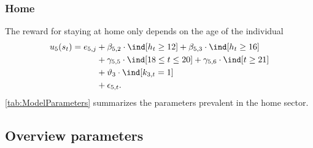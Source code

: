 \FloatBarrier\subsubsection{Home}
The reward for staying at home only depends on the age of the individual
%
\begin{align}
    u_5(s_t) =  e_{5,j} & + \beta_{5,2} \cdot \ind[h_t \geq 12] + \beta_{5,3} \cdot \ind[h_t \geq 16] 			 \nonumber \\
    							   & + \gamma_{5,5} \cdot \ind[18 \leq t \leq 20] + \gamma_{5,6} \cdot \ind[t \geq 21] \nonumber \\
    							   & + \vartheta_3 \cdot \ind[k_{3,t} = 1]  \nonumber \\
    							   & + \epsilon_{5,t}.
\end{align}
%
\autoref{tab:ModelParameters} summarizes the parameters prevalent in the home sector.

\clearpage 

\FloatBarrier\subsection{Overview parameters}

